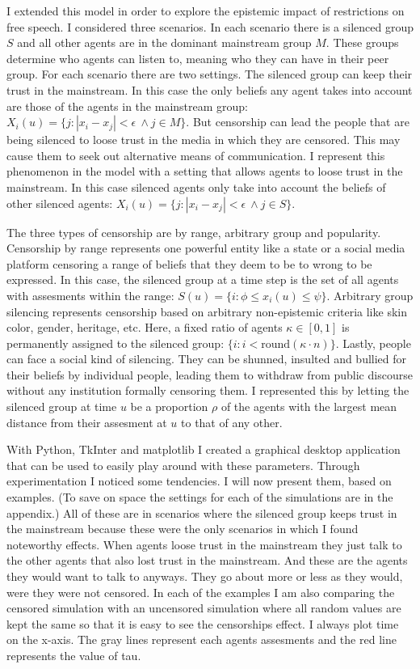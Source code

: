 \documentclass{essay-formal}
\begin{document}
I extended this model in order to explore the epistemic impact of restrictions on free speech. I considered three scenarios. In each scenario there is a silenced group $S$ and all other agents are in the dominant mainstream group $M$. These groups determine who agents can listen to, meaning who they can have in their peer group. For each scenario there are two settings. The silenced group can keep their trust in the mainstream. In this case the only beliefs any agent takes into account are those of the agents in the mainstream group: $X_i(u) = \{j: |x_i - x_j| < \epsilon\ \wedge j \in M\}$. But censorship can lead the people that are being silenced to loose trust in the media in which they are censored. This may cause them to seek out alternative means of communication. I represent this phenomenon in the model with a setting that allows agents to loose trust in the mainstream. In this case silenced agents only take into account the beliefs of other silenced agents: $X_i(u) = \{j: |x_i - x_j| < \epsilon\ \wedge j \in S\}$.

The three types of censorship are by range, arbitrary group and popularity. Censorship by range represents one powerful entity like a state or a social media platform censoring a range of beliefs that they deem to be to wrong to be expressed. In this case, the silenced group at a time step is the set of all agents with assesments within the range: $S(u) = \{i: \phi \leq x_i(u) \leq \psi \}$. Arbitrary group silencing represents censorship based on arbitrary non-epistemic criteria like skin color, gender, heritage, etc. Here, a fixed ratio of agents $\kappa \in [0, 1]$ is permanently assigned to the silenced group: $\{i: i < \text{round}(\kappa \cdot n)\}$. Lastly, people can face a social kind of silencing. They can be shunned, insulted and bullied for their beliefs by individual people, leading them to withdraw from public discourse without any institution formally censoring them. I represented this by letting the silenced group at time $u$ be a proportion $\rho$ of the agents with the largest mean distance from their assesment at $u$ to that of any other.

With Python, TkInter and matplotlib I created a graphical desktop application that can be used to easily play around with these parameters. Through experimentation I noticed some tendencies. I will now present them, based on examples. (To save on space the settings for each of the simulations are in the appendix.) All of these are in scenarios where the silenced group keeps trust in the mainstream because these were the only scenarios in which I found noteworthy effects. When agents loose trust in the mainstream they just talk to the other agents that also lost trust in the mainstream. And these are the agents they would want to talk to anyways. They go about more or less as they would, were they were not censored. In each of the examples I am also comparing the censored simulation with an uncensored simulation where all random values are kept the same so that it is easy to see the censorships effect. I always plot time on the x-axis. The gray lines represent each agents assesments and the red line represents the value of tau.
\end{document}
